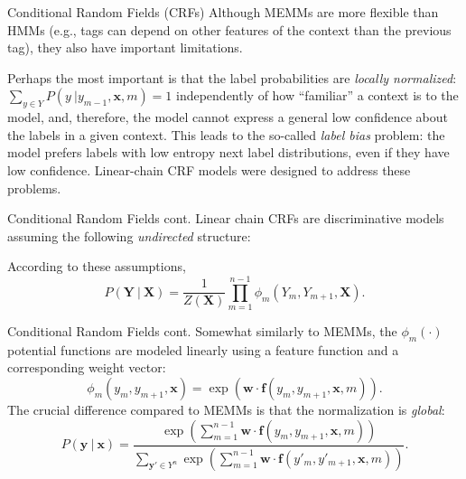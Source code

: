 \documentclass[style=upen, size=14pt]{powerdot}
\theoremstyle{definition}
\begin{document}
  \begin{slide}[toc=CRFs]{Conditional Random Fields (CRFs)}
    Although MEMMs are more flexible than HMMs (e.g., tags can depend on other
    features of the context than the previous tag), they also have important
    limitations.\bigskip

    Perhaps the most important is that the label probabilities are \emph{locally
      normalized}: $\sum_{y\in Y}P(y~|y_{m-1}, \mathbf{x}, m)=1$ independently
    of how ``familiar'' a context is to the model, and, therefore, the model
    cannot express a general low confidence about the labels in a given context.
    This leads to the so-called \emph{label bias} problem: the model prefers
    labels with low entropy next label distributions, even if they have low
    confidence. Linear-chain CRF models were designed to address these problems.
  \end{slide}

  \begin{slide}[toc=]{Conditional Random Fields cont.}
    Linear chain CRFs are discriminative models assuming the following
    \emph{undirected} structure:
    \begin{center}
    \end{center}
    According to these assumptions,
    $$
    P(\mathbf{Y}~|~\mathbf{X}) = \frac{1}{Z(\mathbf{X})}\prod_{m=1}^{n-1} \phi_{m}(Y_m, Y_{m+1}, \mathbf{X}).
    $$
  \end{slide}

  \begin{slide}[toc=]{Conditional Random Fields cont.}
    Somewhat similarly to MEMMs, the $\phi_m(\cdot)$ potential functions are
    modeled linearly using a feature function and a corresponding weight vector:
    $$
    \phi_m(y_m, y_{m+1},\mathbf{x})={\exp (\mathbf{w} \cdot
      \mathbf{f}(y_m,y_{m+1}, \mathbf{x}, m))}.
    $$
    The crucial difference compared to MEMMs is that the normalization is \emph{global}:
    $$
    P(\mathbf{y}~|~\mathbf{x}) =
    \frac{\exp(\sum_{m=1}^{n-1}\mathbf{w}\cdot\mathbf{f}(y_m,y_{m+1}, \mathbf{x}, m))}
    {\sum_{\mathbf{y}'\in Y^n}\exp(\sum_{m=1}^{n-1}\mathbf{w}\cdot\mathbf{f}(y'_m,y'_{m+1}, \mathbf{x}, m))}.
    $$
    
  \end{slide}
\end{document}
